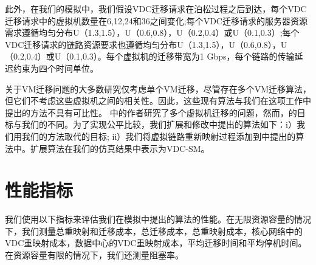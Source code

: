 此外，在我们的模拟中，我们假设VDC迁移请求在泊松过程之后到达，每个VDC迁移请求中的虚拟机数量在6,12,24和36之间变化;每个VDC迁移请求的服务器资源需求遵循均匀分布U（1.3,1.5），U（0.6,0.8），U（0.2,0.4）或U（0.1,0.3）;每个VDC迁移请求的链路资源要求也遵循均匀分布U（1.3,1.5），U（0.6,0.8），U（0.2,0.4）或U（0.1,0.3）。每个虚拟机的迁移带宽为1 Gbps，每个链路的传输延迟约束为四个时间单位。

关于VM迁移问题的大多数研究仅考虑单个VM迁移，尽管存在多个VM迁移算法，但它们不考虑这些虚拟机之间的相关性。因此，这些现有算法与我们在这项工作中提出的方法不具有可比性。 \cite{xu2013iaware}中的作者研究了多个虚拟机迁移的问题，然而，\cite{xu2013iaware}的目标与我们的不同。为了实现公平比较，我们扩展和修改\cite{xu2013iaware}中提出的算法如下：i）我们用我们的方法取代\cite{xu2013iaware}的目标; ii）我们将虚拟链路重新映射过程添加到\cite{xu2013iaware}中提出的算法中。扩展算法在我们的仿真结果中表示为VDC-SM。

\section{性能指标}
我们使用以下指标来评估我们在模拟中提出的算法的性能。在无限资源容量的情况下，我们测量总重映射和迁移成本，总迁移成本，总重映射成本，核心网络中的VDC重映射成本，数据中心的VDC重映射成本，平均迁移时间和平均停机时间。在资源容量有限的情况下，我们还测量阻塞率。

